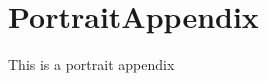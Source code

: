 \chapter{PortraitAppendix}
\label{app:portrait_appendix}
\begin{center}
This is a portrait appendix
\end{center}

